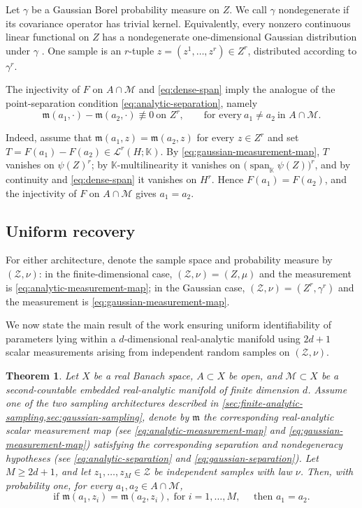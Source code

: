 \documentclass[11pt,oneside]{amsart}
\theoremstyle{plain}
\newtheorem{theorem}{Theorem}[section]
\theoremstyle{definition}
\theoremstyle{remark}
\newcommand{\KK}{\mathbb{K}}
\newcommand{\calL}{\mathcal{L}}
\newcommand{\calM}{\mathcal{M}}
\newcommand{\calZ}{\mathcal{Z}}
\begin{document}
Let $\gamma$ be a Gaussian Borel probability measure on $Z$. We call $\gamma$ nondegenerate if its covariance operator has trivial kernel. Equivalently, every nonzero continuous linear functional on $Z$ has a nondegenerate one-dimensional Gaussian distribution under $\gamma$ \cite{Bogachev1998-oc,da2006introduction}. One sample is an $r$-tuple $z=(z^1,\ldots,z^r)\in Z^r$, distributed according to $\gamma^r$.
 

The injectivity of $F$ on $A\cap\calM$ and \eqref{eq:dense-span} imply the analogue of the point-separation condition \eqref{eq:analytic-separation}, namely
\begin{equation}\label{eq:gaussian-separation}
    \mathfrak m(a_1,\cdot)-\mathfrak m(a_2,\cdot)\not\equiv0\ \text{on }Z^r,\qquad\text{for every}~a_1\neq a_2\ \text{in }A\cap\calM.
\end{equation}

Indeed, assume that $\mathfrak m(a_1,z)=\mathfrak m(a_2,z)$ for every $z\in Z^r$ and set
$T=F(a_1)-F(a_2)\in\calL^r(H;\KK)$. By \eqref{eq:gaussian-measurement-map}, $T$ vanishes on
$\psi(Z)^r$; by $\KK$-multilinearity it vanishes on
$\bigl(\operatorname{span}_\KK\psi(Z)\bigr)^r$, and by continuity and \eqref{eq:dense-span}
it vanishes on $H^r$. Hence $F(a_1)=F(a_2)$, and the injectivity of $F$ on $A\cap\calM$
gives $a_1=a_2$.


\subsection{Uniform recovery}\label{sec:uniform-recovery}
For either architecture, denote the sample space and probability measure by $(\calZ,\nu)$: in the finite-dimensional case, $(\calZ,\nu)=(Z,\mu)$ and the measurement is \eqref{eq:analytic-measurement-map}; in the Gaussian case, $(\calZ,\nu)=(Z^r,\gamma^r)$ and the measurement is \eqref{eq:gaussian-measurement-map}.

We now state the main result of the work ensuring uniform identifiability of parameters lying within a $d$-dimensional real-analytic manifold using $2d+1$ scalar measurements arising from independent random samples on $(\calZ,\nu)$.

\begin{theorem}\label{thm:main}
Let $X$ be a real Banach space, $A\subset X$ be open, and $\calM\subset X$ be a second-countable embedded real-analytic manifold of finite dimension $d$. Assume one of the two sampling architectures described in \cref{sec:finite-analytic-sampling,sec:gaussian-sampling}, denote by $\mathfrak m$ the corresponding real-analytic scalar measurement map (see \eqref{eq:analytic-measurement-map} and \eqref{eq:gaussian-measurement-map}) satisfying the corresponding separation and nondegeneracy hypotheses (see \eqref{eq:analytic-separation} and \eqref{eq:gaussian-separation}). Let $M\geq 2d+1$, and let $z_1,\ldots,z_M\in\calZ$ be independent samples with law $\nu$. Then, with probability one, for every $a_1,a_2\in A\cap\calM$, 
\[
   \text{if } \mathfrak m(a_1,z_i)=\mathfrak m(a_2,z_i),\; \text{for } i=1,\dots,M, \quad \text{ then } a_1=a_2.
\]
\end{theorem}
\end{document}
